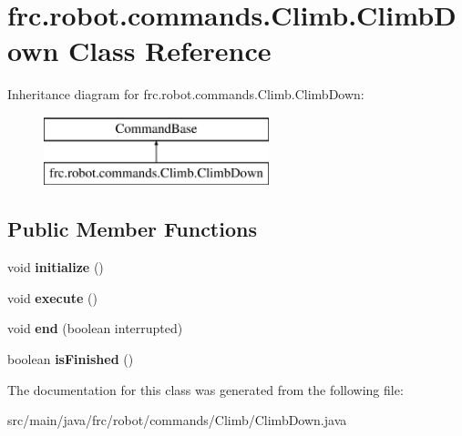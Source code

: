 \hypertarget{classfrc_1_1robot_1_1commands_1_1_climb_1_1_climb_down}{}\section{frc.\+robot.\+commands.\+Climb.\+Climb\+Down Class Reference}
\label{classfrc_1_1robot_1_1commands_1_1_climb_1_1_climb_down}
Inheritance diagram for frc.\+robot.\+commands.\+Climb.\+Climb\+Down\+:\begin{figure}[H]
\begin{center}
\leavevmode
\includegraphics[height=2.000000cm]{classfrc_1_1robot_1_1commands_1_1_climb_1_1_climb_down}
\end{center}
\end{figure}
\subsection*{Public Member Functions}
\begin{DoxyCompactItemize}
\item 
\mbox{\label{classfrc_1_1robot_1_1commands_1_1_climb_1_1_climb_down_a281b01d1dc1545b2e346e8ed15a1da39}} 
void {\bfseries initialize} ()
\item 
\mbox{\label{classfrc_1_1robot_1_1commands_1_1_climb_1_1_climb_down_af88675f71dece131fe4c002ae69aa0ee}} 
void {\bfseries execute} ()
\item 
\mbox{\label{classfrc_1_1robot_1_1commands_1_1_climb_1_1_climb_down_af967bfcdb88dce5f9f48b8a80bc8bf47}} 
void {\bfseries end} (boolean interrupted)
\item 
\mbox{\label{classfrc_1_1robot_1_1commands_1_1_climb_1_1_climb_down_a8a756d79b26f7108ce628b0d824b26b2}} 
boolean {\bfseries is\+Finished} ()
\end{DoxyCompactItemize}


The documentation for this class was generated from the following file\+:\begin{DoxyCompactItemize}
\item 
src/main/java/frc/robot/commands/\+Climb/Climb\+Down.\+java\end{DoxyCompactItemize}
